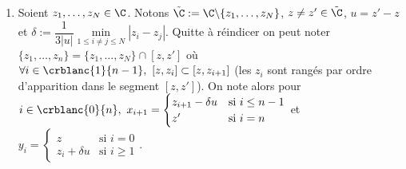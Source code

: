 \documentclass{book}
\begin{document}
\begin{enumerate}[leftmargin=*]
		\textit{Remarque : avec le résultat de l'exercice suivant on peut donner une autre preuve. Pour $\U\backslash\{z\}$ on considère la tangente au cercle unité passant par $z$. $\U\backslash\{z\}$ est alors inclus dans l'un des demi-plans (Un demi-plan est connexe par arcs) définis par la tangente.\\
		Pour $\U\backslash\{z,z'\}$ on considère la droite formée par $z$ et $z'$. Le cercle unité n'est contenu dans aucun des demi-plans définis par la droite.}
		\begin{multicols}{2}
		\\
		\end{multicols}
		Soit $\mathcal C\subset\U$ connexe par arcs. $\forall z\in \overline{\mathcal C},\ \exists!\theta(z)\in ]-\pi,\pi],\ z=e^{i\theta(z)}$. On montre comme on l'a fait pour $f$ avant que $\theta$ est continue. Donc $\theta(\mathcal C)$ est un connexe par arcs de $\R$ : c'est un intervalle.\\
		On a montré qu'il existe un intervalle $I$ tel que $\mathcal C=\{e^{it},\ t\in I\}$, c'est-à-dire que $\mathcal C$ est un arc de cercle (en considérant $\U$ comme un arc de cercle).
		\item Soient $z_1,\dots,z_N\in \C$. Notons $\tilde\C:=\C\backslash\{z_1,\dots,z_N\}$, $z\ne z'\in \tilde\C$, $u=z'-z$ et $\delta:=\dfrac{1}{3|u|}\min\limits_{1\leq i\ne j\leq N}|z_i-z_j|$. Quitte à réindicer on peut noter $\{z_1,\dots,z_n\}=\{z_1,\dots,z_N\}\cap[z,z']$ où $\forall i\in \crblanc{1}{n-1},\ [z,z_i]\subset [z,z_{i+1}]$ (les $z_i$ sont rangés par ordre d'apparition dans le segment $[z,z']$). On note alors pour $i\in \crblanc{0}{n},\ x_{i+1}=\begin{cases}
			z_{i+1}-\delta u&\mbox{si }i\leq n-1\\
			z'&\mbox{si }i=n
		\end{cases}$ et $y_i=\begin{cases}
			z&\mbox{si }i=0\\
			z_i+\delta u&\mbox{si }i\geq 1
		\end{cases}$.

\end{enumerate}
\end{document}

